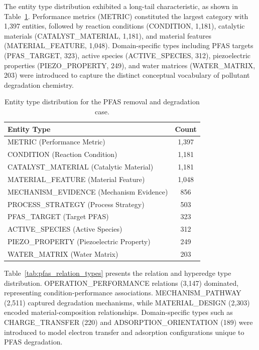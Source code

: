 The entity type distribution exhibited a long-tail characteristic, as shown in Table~\ref{tab:pfas_entity_types}. Performance metrics (METRIC) constituted the largest category with 1,397 entities, followed by reaction conditions (CONDITION, 1,181), catalytic materials (CATALYST\_MATERIAL, 1,181), and material features (MATERIAL\_FEATURE, 1,048). Domain-specific types including PFAS targets (PFAS\_TARGET, 323), active species (ACTIVE\_SPECIES, 312), piezoelectric properties (PIEZO\_PROPERTY, 249), and water matrices (WATER\_MATRIX, 203) were introduced to capture the distinct conceptual vocabulary of pollutant degradation chemistry.

\begin{table}[htbp]
\centering
\caption{Entity type distribution for the PFAS removal and degradation case.}
\label{tab:pfas_entity_types}
\begin{tabular}{@{}lc@{}}
\toprule
\textbf{Entity Type} & \textbf{Count} \\
\midrule
METRIC (Performance Metric) & 1,397 \\
CONDITION (Reaction Condition) & 1,181 \\
CATALYST\_MATERIAL (Catalytic Material) & 1,181 \\
MATERIAL\_FEATURE (Material Feature) & 1,048 \\
MECHANISM\_EVIDENCE (Mechanism Evidence) & 856 \\
PROCESS\_STRATEGY (Process Strategy) & 503 \\
PFAS\_TARGET (Target PFAS) & 323 \\
ACTIVE\_SPECIES (Active Species) & 312 \\
PIEZO\_PROPERTY (Piezoelectric Property) & 249 \\
WATER\_MATRIX (Water Matrix) & 203 \\
\bottomrule
\end{tabular}
\end{table}

Table~\ref{tab:pfas_relation_types} presents the relation and hyperedge type distribution. OPERATION\_PERFORMANCE relations (3,147) dominated, representing condition-performance associations. MECHANISM\_PATHWAY (2,511) captured degradation mechanisms, while MATERIAL\_DESIGN (2,303) encoded material-composition relationships. Domain-specific types such as CHARGE\_TRANSFER (220) and ADSORPTION\_ORIENTATION (189) were introduced to model electron transfer and adsorption configurations unique to PFAS degradation.


